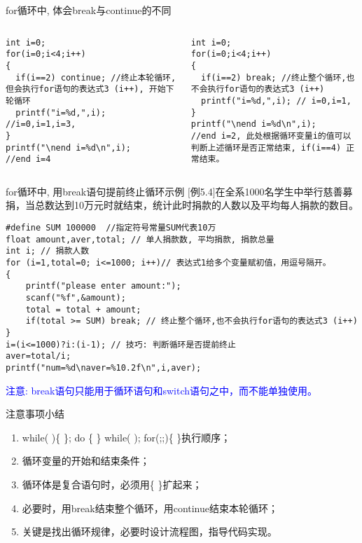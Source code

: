 \begin{frame}[fragile]{for循环中, 体会break与continue的不同}
\vspace{-0.5cm}
\begin{columns}
\begin{lstlisting}
int i=0;
for(i=0;i<4;i++) 
{
  if(i==2) continue; //终止本轮循环,但会执行for语句的表达式3 (i++), 开始下轮循环 
  printf("i=%d,",i); //i=0,i=1,i=3,
}
printf("\nend i=%d\n",i);
//end i=4
\end{lstlisting} 
\begin{lstlisting}[frame=leftline]
int i=0;
for(i=0;i<4;i++) 
{
  if(i==2) break; //终止整个循环,也不会执行for语句的表达式3 (i++)
  printf("i=%d,",i); // i=0,i=1, 
}
printf("\nend i=%d\n",i);
//end i=2, 此处根据循环变量i的值可以判断上述循环是否正常结束, if(i==4) 正常结束。 
\end{lstlisting} 
\end{columns}
\end{frame}

\begin{frame}{for循环中, 用break语句提前终止循环示例}
\vspace{-0.2cm}
$[$例5.4$]$在全系1000名学生中举行慈善募捐，当总数达到10万元时就结束，统计此时捐款的人数以及平均每人捐款的数目。
\begin{lstlisting}
#define SUM 100000  //指定符号常量SUM代表10万
float amount,aver,total; // 单人捐款数, 平均捐款, 捐款总量
int i; // 捐款人数
for (i=1,total=0; i<=1000; i++)// 表达式1给多个变量赋初值，用逗号隔开。
{
	printf("please enter amount:");
	scanf("%f",&amount);
	total = total + amount; 
	if(total >= SUM) break; // 终止整个循环,也不会执行for语句的表达式3 (i++)
}
i=(i<=1000)?i:(i-1); // 技巧: 判断循环是否提前终止
aver=total/i;
printf("num=%d\naver=%10.2f\n",i,aver); 
\end{lstlisting}
\textcolor{blue}{注意: break语句只能用于循环语句和switch语句之中，而不能单独使用。}
\end{frame}

\begin{frame}{注意事项小结}
\begin{enumerate}
	\setlength{\itemsep}{.5cm}
	\item while( )\{ \}; do \{ \} while( ); for(;;)\{ \}执行顺序；
	\item 循环变量的开始和结束条件；
	\item 循环体是复合语句时，必须用\{ \}扩起来；
	\item 必要时，用break结束整个循环，用continue结束本轮循环；
	\item 关键是找出循环规律，必要时设计流程图，指导代码实现。	
\end{enumerate}
\end{frame}